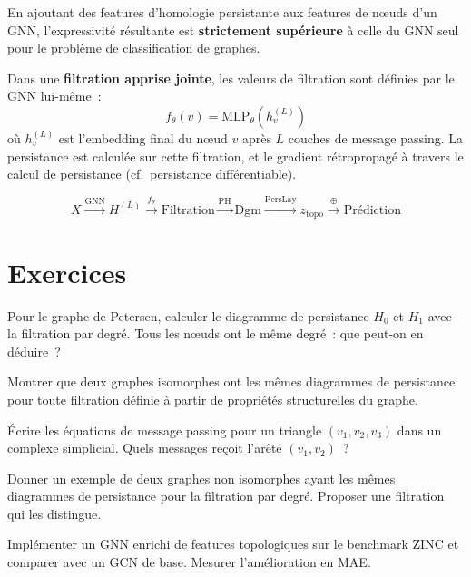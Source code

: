 \begin{proposition}
En ajoutant des features d'homologie persistante aux features de
n\oe uds d'un GNN, l'expressivit\'e r\'esultante est
\textbf{strictement sup\'erieure} \`a celle du GNN seul pour
le probl\`eme de classification de graphes.
\end{proposition}

\begin{definition}
Dans une \textbf{filtration apprise jointe}, les valeurs de
filtration sont d\'efinies par le GNN lui-m\^eme~:
\[
  f_\theta(v) = \mathrm{MLP}_\theta(h_v^{(L)})
\]
o\`u $h_v^{(L)}$ est l'embedding final du n\oe ud $v$ apr\`es $L$
couches de message passing. La persistance est calcul\'ee sur cette
filtration, et le gradient r\'etropropag\'e \`a travers le calcul
de persistance (cf.\ persistance diff\'erentiable).
\end{definition}

\begin{formules}[title=\textbf{Pipeline GNN + TDA}]
\[
  X \xrightarrow{\text{GNN}} H^{(L)}
  \xrightarrow{f_\theta} \text{Filtration}
  \xrightarrow{\text{PH}} \mathrm{Dgm}
  \xrightarrow{\text{PersLay}} z_{\mathrm{topo}}
  \xrightarrow{\oplus} \text{Pr\'ediction}
\]
\end{formules}

\section{Exercices}

\begin{exercice}
Pour le graphe de Petersen, calculer le diagramme de persistance
$H_0$ et $H_1$ avec la filtration par degr\'e. Tous les n\oe uds
ont le m\^eme degr\'e~: que peut-on en d\'eduire~?
\end{exercice}

\begin{exercice}
Montrer que deux graphes isomorphes ont les m\^emes diagrammes de
persistance pour toute filtration d\'efinie \`a partir de
propri\'et\'es structurelles du graphe.
\end{exercice}

\begin{exercice}
\'Ecrire les \'equations de message passing pour un triangle
$(v_1, v_2, v_3)$ dans un complexe simplicial. Quels messages
re\c{c}oit l'ar\^ete $(v_1, v_2)$~?
\end{exercice}

\begin{exercice}
Donner un exemple de deux graphes non isomorphes ayant les m\^emes
diagrammes de persistance pour la filtration par degr\'e. Proposer
une filtration qui les distingue.
\end{exercice}

\begin{exercice}[Projet]
Impl\'ementer un GNN enrichi de features topologiques sur le
benchmark ZINC et comparer avec un GCN de base. Mesurer
l'am\'elioration en MAE.
\end{exercice}
